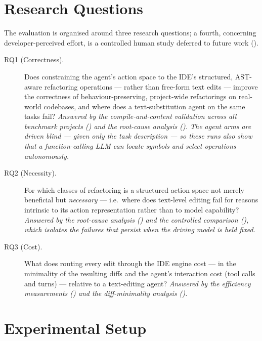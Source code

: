 \section{Research Questions}
\label{sec:eval-rqs}
The evaluation is organised around three research questions; a fourth,
concerning developer-perceived effort, is a controlled human study deferred to
future work ().

\begin{description}
  \item[RQ1 (Correctness).] Does constraining the agent's action space to the
    IDE's structured, AST-aware refactoring operations --- rather than free-form
    text edits --- improve the correctness of behaviour-preserving, project-wide
    refactorings on real-world codebases, and where does a text-substitution agent
    on the same tasks fail? \emph{Answered by the compile-and-content validation
    across all benchmark projects
    ()
    and the root-cause analysis (). The agent arms are
    driven blind --- given only the task description --- so these runs also show
    that a function-calling LLM can locate symbols and select operations
    autonomously.}
  \item[RQ2 (Necessity).] For which classes of refactoring is a structured action
    space not merely beneficial but \emph{necessary} --- i.e.\ where does
    text-level editing fail for reasons intrinsic to its action representation
    rather than to model capability? \emph{Answered by the root-cause analysis
    () and the controlled comparison
    (), which isolates the failures that persist when the
    driving model is held fixed.}
  \item[RQ3 (Cost).] What does routing every edit through the IDE engine cost ---
    in the minimality of the resulting diffs and the agent's interaction cost (tool
    calls and turns) --- relative to a text-editing agent? \emph{Answered by the
    efficiency measurements () and the diff-minimality
    analysis ().}
\end{description}

\section{Experimental Setup}
\label{sec:eval-setup}

